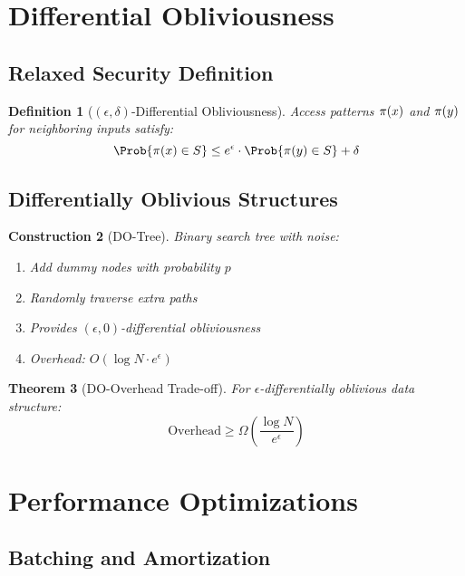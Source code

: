 \documentclass[11pt,final,hidelinks]{article}
\newtheorem{theorem}{Theorem}[section]
\newtheorem{definition}[theorem]{Definition}
\newtheorem{construction}[theorem]{Construction}
\begin{document}
\section{Differential Obliviousness}

\subsection{Relaxed Security Definition}

\begin{definition}[$(\epsilon, \delta)$-Differential Obliviousness]
Access patterns $\pi(x)$ and $\pi(y)$ for neighboring inputs satisfy:
\begin{equation}
\Prob{\Pattern{x} \in S} \leq e^\epsilon \cdot \Prob{\Pattern{y} \in S} + \delta
\end{equation}
\end{definition}

\subsection{Differentially Oblivious Structures}

\begin{construction}[DO-Tree]
Binary search tree with noise:
\begin{enumerate}
    \item Add dummy nodes with probability $p$
    \item Randomly traverse extra paths
    \item Provides $(\epsilon, 0)$-differential obliviousness
    \item Overhead: $O(\log N \cdot e^\epsilon)$
\end{enumerate}
\end{construction}

\begin{theorem}[DO-Overhead Trade-off]
For $\epsilon$-differentially oblivious data structure:
\begin{equation}
\text{Overhead} \geq \Omega\left(\frac{\log N}{e^\epsilon}\right)
\end{equation}
\end{theorem}

\section{Performance Optimizations}

\subsection{Batching and Amortization}
\end{document}
